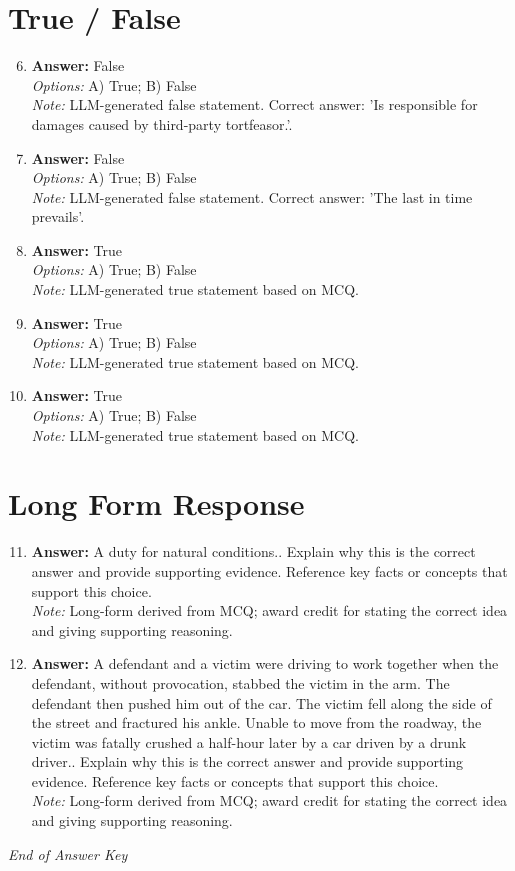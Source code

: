 \documentclass[12pt]{article}
\begin{document}
\section*{True / False}
\begin{enumerate}[label=\arabic*.]
\setcounter{enumi}{5}
\item \textbf{Answer:} False
\\ \textit{Options:} A) True; B) False
\\ \textit{Note:} LLM-generated false statement. Correct answer: 'Is responsible for damages caused by third-party tortfeasor.'.
\item \textbf{Answer:} False
\\ \textit{Options:} A) True; B) False
\\ \textit{Note:} LLM-generated false statement. Correct answer: 'The last in time prevails'.
\item \textbf{Answer:} True
\\ \textit{Options:} A) True; B) False
\\ \textit{Note:} LLM-generated true statement based on MCQ.
\item \textbf{Answer:} True
\\ \textit{Options:} A) True; B) False
\\ \textit{Note:} LLM-generated true statement based on MCQ.
\item \textbf{Answer:} True
\\ \textit{Options:} A) True; B) False
\\ \textit{Note:} LLM-generated true statement based on MCQ.
\end{enumerate}

\section*{Long Form Response}
\begin{enumerate}[label=\arabic*.]
\setcounter{enumi}{10}
\item \textbf{Answer:} A duty for natural conditions.. Explain why this is the correct answer and provide supporting evidence. Reference key facts or concepts that support this choice.
\\ \textit{Note:} Long-form derived from MCQ; award credit for stating the correct idea and giving supporting reasoning.
\item \textbf{Answer:} A defendant and a victim were driving to work together when the defendant, without provocation, stabbed the victim in the arm. The defendant then pushed him out of the car. The victim fell along the side of the street and fractured his ankle. Unable to move from the roadway, the victim was fatally crushed a half-hour later by a car driven by a drunk driver.. Explain why this is the correct answer and provide supporting evidence. Reference key facts or concepts that support this choice.
\\ \textit{Note:} Long-form derived from MCQ; award credit for stating the correct idea and giving supporting reasoning.
\end{enumerate}

\vfill
\noindent\textit{End of Answer Key}
\end{document}
